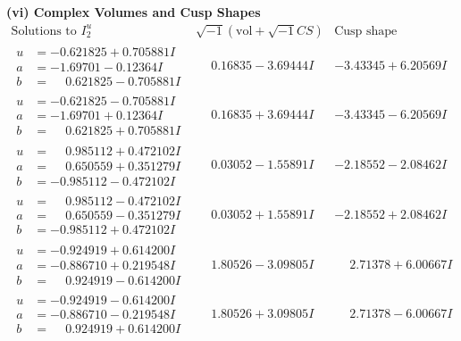 \documentclass[1p]{elsarticle_modified}
\theoremstyle{definition}
\newcommand{\I}{\sqrt{-1}}
\begin{document}
\newpage\flushleft \textbf{(vi) Complex Volumes and Cusp Shapes}
$$\begin{array}{c|c|c}  
\text{Solutions to }I^u_{2}& \I (\text{vol} + \sqrt{-1}CS) & \text{Cusp shape}\\
 \hline 
\begin{aligned}
u &= -0.621825 + 0.705881 I \\
a &= -1.69701 - 0.12364 I \\
b &= \phantom{-}0.621825 - 0.705881 I\end{aligned}
 & \phantom{-}0.16835 - 3.69444 I & -3.43345 + 6.20569 I \\ \hline\begin{aligned}
u &= -0.621825 - 0.705881 I \\
a &= -1.69701 + 0.12364 I \\
b &= \phantom{-}0.621825 + 0.705881 I\end{aligned}
 & \phantom{-}0.16835 + 3.69444 I & -3.43345 - 6.20569 I \\ \hline\begin{aligned}
u &= \phantom{-}0.985112 + 0.472102 I \\
a &= \phantom{-}0.650559 + 0.351279 I \\
b &= -0.985112 - 0.472102 I\end{aligned}
 & \phantom{-}0.03052 - 1.55891 I & -2.18552 - 2.08462 I \\ \hline\begin{aligned}
u &= \phantom{-}0.985112 - 0.472102 I \\
a &= \phantom{-}0.650559 - 0.351279 I \\
b &= -0.985112 + 0.472102 I\end{aligned}
 & \phantom{-}0.03052 + 1.55891 I & -2.18552 + 2.08462 I \\ \hline\begin{aligned}
u &= -0.924919 + 0.614200 I \\
a &= -0.886710 + 0.219548 I \\
b &= \phantom{-}0.924919 - 0.614200 I\end{aligned}
 & \phantom{-}1.80526 - 3.09805 I & \phantom{-}2.71378 + 6.00667 I \\ \hline\begin{aligned}
u &= -0.924919 - 0.614200 I \\
a &= -0.886710 - 0.219548 I \\
b &= \phantom{-}0.924919 + 0.614200 I\end{aligned}
 & \phantom{-}1.80526 + 3.09805 I & \phantom{-}2.71378 - 6.00667 I \\ \hline\begin{aligned}

\end{aligned}
\end{array}$$
\end{document}
